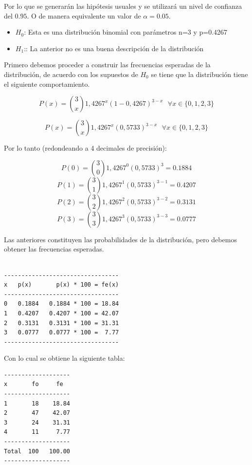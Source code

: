 Por lo que se generarán las hipótesis usuales y se utilizará un nivel de confianza del $0.95$. O de manera equivalente un valor de $\alpha=0.05$.

\begin{itemize}
\item[] \textbf{$H_0$}: Esta es una distribución binomial 
    con parámetros n=3 y p=0.4267

\item[] \textbf{$H_1$}:: La anterior no es una buena descripción de la distribución

\end{itemize}

Primero debemos proceder a construir las frecuencias esperadas de la distribución, de acuerdo con los supuestos de $H_0$ se tiene que la distribución tiene el siguiente comportamiento.

$$P(x) = \binom{3}{x} 1,4267^x (1-0,4267)^{3-x} \text{    }\forall x \in \{0,1,2,3\}$$

$$P(x) = \binom{3}{x} 1,4267^x (0,5733)^{3-x} \text{    }\forall x \in \{0,1,2,3\}$$

Por lo tanto (redondeando a 4 decimales de precisión):

$$P(0) = \binom{3}{0} 1,4267^0 (0,5733)^{3} = 0.1884 $$
$$P(1) = \binom{3}{1} 1,4267^1 (0,5733)^{3-1} =  0.4207 $$
$$P(2) = \binom{3}{2} 1,4267^2 (0,5733)^{3-2} =  0.3131 $$
$$P(3) = \binom{3}{3} 1,4267^3 (0,5733)^{3-3} = 0.0777$$

Las anteriores constituyen las probabilidades de la distribución, pero debemos obtener las frecuencias esperadas.

\begin{verbatim}

---------------------------------
x   p(x)       p(x) * 100 = fe(x)
---------------------------------
0   0.1884   0.1884 * 100 = 18.84
1   0.4207   0.4207 * 100 = 42.07
2   0.3131   0.3131 * 100 = 31.31
3   0.0777   0.0777 * 100 =  7.77
---------------------------------
\end{verbatim}


Con lo cual se obtiene la siguiente tabla:
\begin{verbatim}
-------------------
x       fo     fe
-------------------
1       18    18.84
2       47    42.07
3       24    31.31
4       11     7.77
-------------------
Total  100   100.00
-------------------
    
\end{verbatim}



